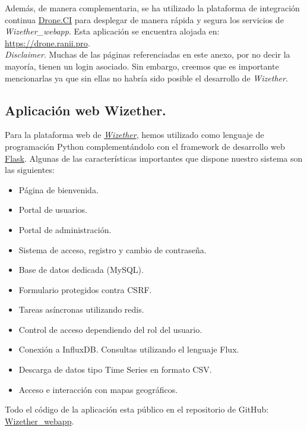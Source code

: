 \documentclass[12pt]{article}
\begin{document}
\noindent Además, de manera complementaria, se ha utilizado la plataforma de integración continua \href{https://www.drone.io/}{Drone.CI} para desplegar de manera rápida y segura los servicios de \textit{Wizether\_webapp}. Esta aplicación se encuentra alojada en: \href{https://drone.ranii.pro}{https://drone.ranii.pro}. \\

\noindent \textit{Disclaimer}. Muchas de las páginas referenciadas en este anexo, por no decir la mayoría,  tienen un login asociado. Sin embargo, creemos que es importante mencionarlas ya que sin ellas no habría sido posible el desarrollo de \textit{Wizether}.

\subsection{Aplicación web Wizether.}
\noindent Para la plataforma web de \href{https://wizether.ranii.pro/}{\textit{Wizether}}, hemos utilizado como lenguaje de programación Python complementándolo con el framework de desarrollo web \href{https://flask.palletsprojects.com/en/1.1.x/}{Flask}. Algunas de las características importantes que dispone nuestro sistema son las siguientes:
\begin{itemize}
	\item Página de bienvenida.
	\item Portal de usuarios.
	\item Portal de administración.
	\item Sistema de acceso, registro y cambio de contraseña.
	\item Base de datos dedicada (MySQL).
	\item Formulario protegidos contra CSRF.
	\item Tareas asíncronas utilizando redis.
	\item Control de acceso dependiendo del rol del usuario.
	\item Conexión a InfluxDB. Consultas utilizando el lenguaje Flux.
	\item Descarga de datos tipo Time Series en formato CSV.
	\item Acceso e interacción con mapas geográficos.
\end{itemize}

\noindent Todo el código de la aplicación esta público en el repositorio de GitHub: \href{https://github.com/Raniita/wizether_webapp}{Wizether\_webapp}.\\
\end{document}

